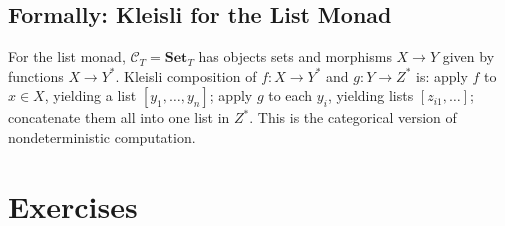 \subsection{Formally: Kleisli for the List Monad}

For the list monad, $\mathcal{C}_T = \mathbf{Set}_T$ has objects sets and
morphisms $X \to Y$ given by functions $X \to Y^*$. Kleisli composition
of $f : X \to Y^*$ and $g : Y \to Z^*$ is: apply $f$ to $x \in X$,
yielding a list $[y_1, \ldots, y_n]$; apply $g$ to each $y_i$, yielding
lists $[z_{i1}, \ldots]$; concatenate them all into one list in $Z^*$.
This is the categorical version of nondeterministic computation.


\section*{Exercises}

